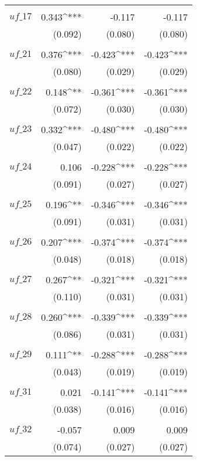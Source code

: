 \begin{apendicesenv}
\begin{longtable}{@{\extracolsep{5pt}}lD{.}{.}{-3} D{.}{.}{-3} D{.}{.}{-3} }
	  & & & \\
	 $uf\_17$ & 0.343^{***} & -0.117 & -0.117 \\
	  & (0.092) & (0.080) & (0.080) \\
	  & & & \\
	 $uf\_21$ & 0.376^{***} & -0.423^{***} & -0.423^{***} \\ 
	  & (0.080) & (0.029) & (0.029) \\
	  & & & \\
	 $uf\_22$ & 0.148^{**} & -0.361^{***} & -0.361^{***} \\
	  & (0.072) & (0.030) & (0.030) \\
	  & & & \\
	 $uf\_23$ & 0.332^{***} & -0.480^{***} & -0.480^{***} \\
	  & (0.047) & (0.022) & (0.022) \\ 
	  & & & \\
	 $uf\_24$ & 0.106 & -0.228^{***} & -0.228^{***} \\
	  & (0.091) & (0.027) & (0.027) \\
	  & & & \\
	 $uf\_25$ & 0.196^{**} & -0.346^{***} & -0.346^{***} \\
	  & (0.091) & (0.031) & (0.031) \\
	  & & & \\
	 $uf\_26$ & 0.207^{***} & -0.374^{***} & -0.374^{***} \\ 
	  & (0.048) & (0.018) & (0.018) \\
	  & & & \\
	 $uf\_27$ & 0.267^{**} & -0.321^{***} & -0.321^{***} \\
	  & (0.110) & (0.031) & (0.031) \\
	  & & & \\
	 $uf\_28$ & 0.260^{***} & -0.339^{***} & -0.339^{***} \\ 
	  & (0.086) & (0.031) & (0.031) \\
	  & & & \\
	 $uf\_29$ & 0.111^{**} & -0.288^{***} & -0.288^{***} \\
	  & (0.043) & (0.019) & (0.019) \\
	  & & & \\
	 $uf\_31$ & 0.021 & -0.141^{***} & -0.141^{***} \\ 
	  & (0.038) & (0.016) & (0.016) \\
	  & & & \\
	 $uf\_32$ & -0.057 & 0.009 & 0.009 \\ 
	  & (0.074) & (0.027) & (0.027) \\

\end{longtable}
\end{apendicesenv}

